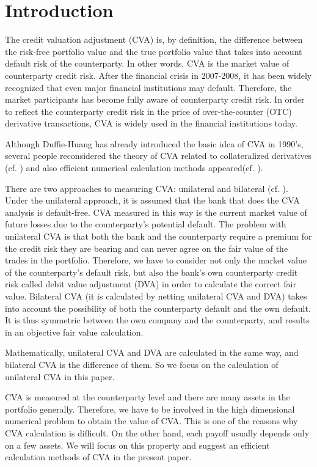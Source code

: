 \documentclass[12pt]{article}
\begin{document}
\section{Introduction}
The credit valuation adjustment (CVA) is, by definition, the difference
between the risk-free portfolio value and the true portfolio value that takes into account
default risk of the counterparty. In other words, CVA is the market value of counterparty credit risk.
After the financial crisis in 2007-2008, it has been widely recognized that even major financial institutions may default.
Therefore, the market participants has become fully aware of counterparty credit risk.
In order to reflect the counterparty credit risk in the price of over-the-counter (OTC) derivative transactions,
CVA is widely used in the financial institutions today.

Although Duffie-Huang \cite{DU} has already introduced the basic idea of CVA  in 1990's, 
several people reconsidered the theory of CVA related to collateralized derivatives (cf. \cite{FT}) and 
also efficient numerical calculation methods appeared(cf. \cite{H}).

There are two approaches to measuring CVA: unilateral and bilateral (cf. \cite{Gre}). 
Under the unilateral approach, it is assumed that the bank that does
the CVA analysis is default-free.
CVA measured in this way is the current market value of future losses due to the counterparty's potential
default. The problem with unilateral CVA is that both the bank and the counterparty require a
premium for the credit risk they are bearing and can never agree on the fair value of the trades in
the portfolio. Therefore, we have to consider not only the market value of the counterparty's default risk, but also the bank's own counterparty credit risk
called debit value adjustment (DVA) in order to calculate the correct fair value. 
Bilateral CVA (it is calculated by netting unilateral CVA and DVA) takes into account the possibility of both the counterparty default and the own default.
It is thus symmetric between the own company and the counterparty, and results in an
objective fair value calculation.

Mathematically, unilateral CVA and DVA are calculated in the same way, and bilateral CVA is the difference of them. So we focus on the calculation of 
unilateral CVA in this paper.

CVA is measured at the counterparty level and there are many assets in the portfolio generally.
Therefore, we have to be involved in the high dimensional numerical problem to obtain the value of CVA.
This is one of the reasons why CVA calculation is difficult.
On the other hand, each payoff usually depends only on a few assets.
We will focus on this property and suggest an efficient calculation methods of CVA 
in the present paper.
\end{document}
